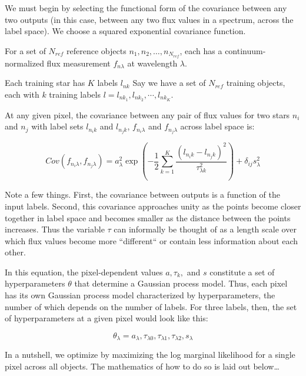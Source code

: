 \documentclass[12pt, preprint]{aastex}
\begin{document}
We must begin by selecting the functional form of the covariance between any 
two outputs (in this case, between any two flux values in a spectrum, across 
the label space). We choose a squared exponential covariance function. 

For a set of $N_{ref}$ reference objects $n_1, n_2, \dots, n_{N_{ref}}$, 
each has a continuum-normalized
flux measurement $f_{n \lambda}$ at wavelength $\lambda$. 

Each training star has $K$ labels $l_{nk}$ 
Say we have a set of $N_{ref}$ training objects, each with $k$ training labels 
$l = l_{nk_1}, l_{nk_2}, \cdots, l_{nk_K}$.

At any given pixel, the covariance between any pair of flux values for two
stars $n_i$ and $n_j$ with label sets $l_{n_i k}$ and $l_{n_j k}$, 
$ f_{n_i \lambda}$ and $f_{n_j \lambda}$ across label space is: 

\begin{equation}
  Cov(f_{n_i \lambda}, f_{n_j \lambda}) = 
  a_\lambda^2 \exp(-\frac{1}{2} 
  \sum_{k=1}^K \frac{(l_{n_i k}-l_{n_j k})^2}{\tau_{\lambda k}^2}) +
  \delta_{ij} s_\lambda^2
\end{equation}

Note a few things. First, the covariance between outputs is a function of the 
input labels. Second, this covariance approaches unity as the points become 
closer together in label space and becomes smaller as the distance between 
the points increases. Thus the variable $\tau$ can informally be thought of 
as a length scale over which flux values become more ``different`` or contain 
less information about each other.

In this equation, the pixel-dependent values $a, \tau_k, $ and $s$ constitute
a set of hyperparameters $\theta$ that determine a Gaussian process model. Thus, 
each pixel has its own Gaussian process model characterized by hyperparameters,
the number of which depends on the number of labels. For three labels, then,
the set of hyperparameters at a given pixel would look like this:

\begin{equation}
  \theta_\lambda = a_\lambda, 
  \tau_{\lambda 0}, \tau_{\lambda 1}, \tau_{\lambda 2}, s_\lambda
\end{equation}

In a nutshell, we optimize by maximizing the log marginal likelihood for a 
single pixel across all objects. The mathematics of how to do so is laid out 
below\ldots
\end{document}
